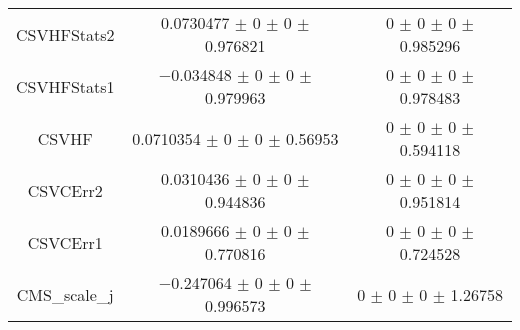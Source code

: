 \begin{table}
\begin{tabular}{ccc}
CSVHFStats2 	& \num{0.0730477} $\pm$ \num{0} $\pm$ \num{0} $\pm$ \num{0.976821} 	& \num{0} $\pm$ \num{0} $\pm$ \num{0} $\pm$ \num{0.985296}\\
CSVHFStats1 	& \num{-0.034848} $\pm$ \num{0} $\pm$ \num{0} $\pm$ \num{0.979963} 	& \num{0} $\pm$ \num{0} $\pm$ \num{0} $\pm$ \num{0.978483}\\
CSVHF 	& \num{0.0710354} $\pm$ \num{0} $\pm$ \num{0} $\pm$ \num{0.56953} 	& \num{0} $\pm$ \num{0} $\pm$ \num{0} $\pm$ \num{0.594118}\\
CSVCErr2 	& \num{0.0310436} $\pm$ \num{0} $\pm$ \num{0} $\pm$ \num{0.944836} 	& \num{0} $\pm$ \num{0} $\pm$ \num{0} $\pm$ \num{0.951814}\\
CSVCErr1 	& \num{0.0189666} $\pm$ \num{0} $\pm$ \num{0} $\pm$ \num{0.770816} 	& \num{0} $\pm$ \num{0} $\pm$ \num{0} $\pm$ \num{0.724528}\\
CMS\_scale\_j 	& \num{-0.247064} $\pm$ \num{0} $\pm$ \num{0} $\pm$ \num{0.996573} 	& \num{0} $\pm$ \num{0} $\pm$ \num{0} $\pm$ \num{1.26758}\\
\bottomrule
\end{tabular}
\end{table}